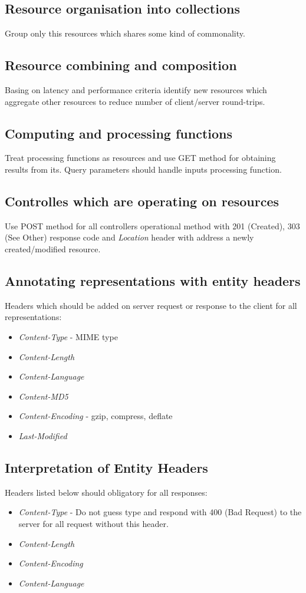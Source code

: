 \documentclass[11pt,a4paper]{article}
\begin{document}
\subsection{Resource organisation into collections}
Group only this resources which shares some kind of commonality.

\subsection{Resource combining and composition}
Basing on latency and performance criteria identify new resources which aggregate other resources to reduce number of client/server round-trips.

\subsection{Computing and processing functions}
Treat processing functions as resources and use GET method for obtaining results from its. Query parameters should handle inputs processing function.

\subsection{Controlles which are operating on resources}
Use POST method for all controllers operational method with 201 (Created), 303 (See Other) response code and \textit{Location} header with address a newly created/modified resource.

\subsection{Annotating representations with entity headers}
Headers which should be added on server request or response to the client for all representations:
\begin{itemize}
	\item \textit{Content-Type} - MIME type
	\item \textit{Content-Length}
	\item \textit{Content-Language}
	\item \textit{Content-MD5}
	\item \textit{Content-Encoding} - gzip, compress, deflate
	\item \textit{Last-Modified}
\end{itemize}

\subsection{Interpretation of Entity Headers}
Headers listed below should obligatory for all responses:
\begin{itemize}
	\item \textit{Content-Type} - Do not guess type and respond with 400 (Bad Request) to the server for all request without this header.
	\item \textit{Content-Length}
	\item \textit{Content-Encoding}
	\item \textit{Content-Language}
\end{itemize}
\end{document}
